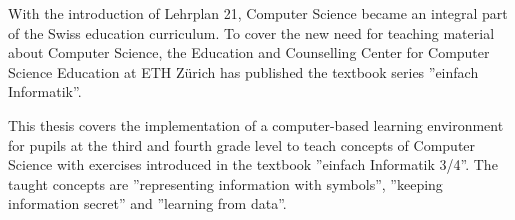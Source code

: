With the introduction of Lehrplan 21, Computer Science became an integral part of the Swiss education curriculum. To cover the new need for teaching material about Computer Science, the Education and Counselling Center for Computer Science Education at ETH Zürich has published the textbook series ''einfach Informatik''. 

This thesis covers the implementation of a computer-based learning environment for pupils at the third and fourth grade level to teach concepts of Computer Science with exercises introduced in the textbook ''einfach Informatik 3/4''. The taught concepts are ''representing information with symbols'', ''keeping information secret'' and ''learning from data''.